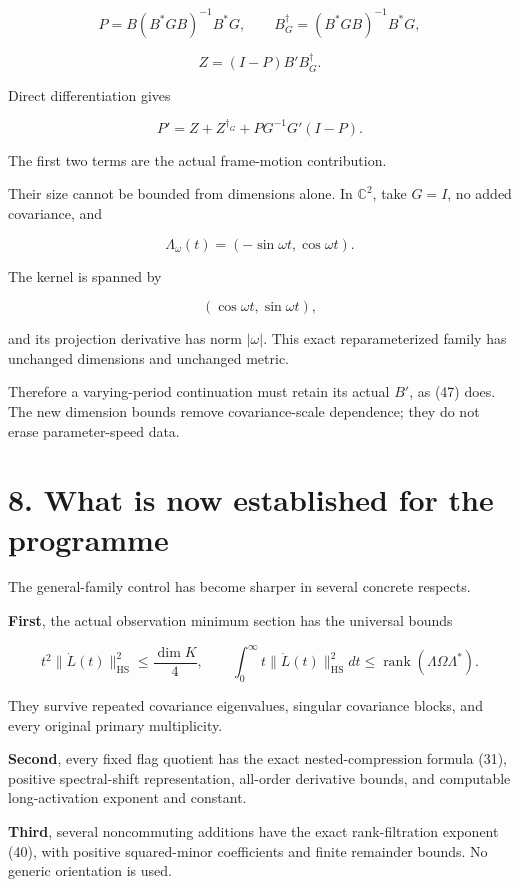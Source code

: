 \[
P=B(B^*GB)^{-1}B^*G,\qquad
B_G^\dagger=(B^*GB)^{-1}B^*G,
\]

\[
Z=(I-P)B'B_G^\dagger.
\]

Direct differentiation gives

\[
\boxed{
P'
=
Z+Z^{\dagger_G}
+PG^{-1}G'(I-P).
}
\tag{47}
\]

The first two terms are the actual frame-motion contribution.

Their size cannot be bounded from dimensions alone. In \(\mathbb C^2\), take \(G=I\), no added covariance, and

\[
\Lambda_\omega(t)=(-\sin\omega t,\cos\omega t).
\]

The kernel is spanned by

\[
(\cos\omega t,\sin\omega t),
\]

and its projection derivative has norm \(|\omega|\). This exact reparameterized family has unchanged dimensions and unchanged metric.

Therefore a varying-period continuation must retain its actual \(B'\), as (47) does. The new dimension bounds remove covariance-scale dependence; they do not erase parameter-speed data.

\section{8. What is now established for the programme}\label{what-is-now-established-for-the-programme}

The general-family control has become sharper in several concrete respects.

\textbf{First}, the actual observation minimum section has the universal bounds

\[
t^2\|\dot L(t)\|_{\mathrm{HS}}^2\le\frac{\dim K}{4},
\qquad
\int_0^\infty t\|\dot L(t)\|_{\mathrm{HS}}^2dt
\le\operatorname{rank}(\Lambda\Omega\Lambda^*).
\]

They survive repeated covariance eigenvalues, singular covariance blocks, and every original primary multiplicity.

\textbf{Second}, every fixed flag quotient has the exact nested-compression formula (31), positive spectral-shift representation, all-order derivative bounds, and computable long-activation exponent and constant.

\textbf{Third}, several noncommuting additions have the exact rank-filtration exponent (40), with positive squared-minor coefficients and finite remainder bounds. No generic orientation is used.

